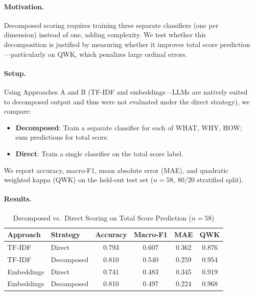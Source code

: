 \documentclass[11pt]{article}
\begin{document}
\paragraph{Motivation.} Decomposed scoring requires training three separate classifiers (one per dimension) instead of one, adding complexity. We test whether this decomposition is justified by measuring whether it improves total score prediction—particularly on QWK, which penalizes large ordinal errors.

\paragraph{Setup.} Using Approaches A and B (TF-IDF and embeddings—LLMs are natively suited to decomposed output and thus were not evaluated under the direct strategy), we compare:
\begin{itemize}
    \item \textbf{Decomposed}: Train a separate classifier for each of WHAT, WHY, HOW; sum predictions for total score.
    \item \textbf{Direct}: Train a single classifier on the total score label.
\end{itemize}
We report accuracy, macro-F1, mean absolute error (MAE), and quadratic weighted kappa (QWK) on the held-out test set ($n = 58$, 80/20 stratified split).

\paragraph{Results.}

\begin{table}[H]
\centering
\caption{Decomposed vs.\ Direct Scoring on Total Score Prediction ($n=58$)}
\label{tab:exp1}
\begin{tabular}{llcccc}
\toprule
\textbf{Approach} & \textbf{Strategy} & \textbf{Accuracy} & \textbf{Macro-F1} & \textbf{MAE} & \textbf{QWK} \\
\midrule
TF-IDF     & Direct     & 0.793 & 0.607 & 0.362 & 0.876 \\
TF-IDF     & Decomposed & 0.810 & 0.540 & 0.259 & 0.954 \\
Embeddings & Direct     & 0.741 & 0.483 & 0.345 & 0.919 \\
Embeddings & Decomposed & 0.810 & 0.497 & 0.224 & 0.968 \\
\bottomrule
\end{tabular}
\end{table}
\end{document}
